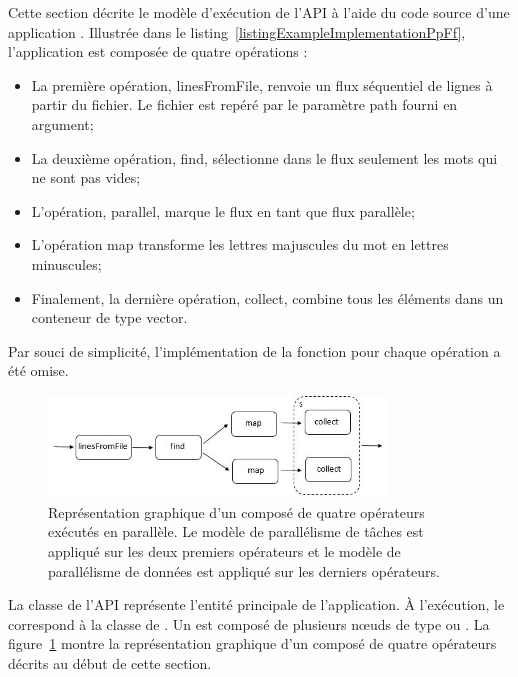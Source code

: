 Cette section d\'ecrite le mod\`ele d'ex\'ecution de l'API \`a l'aide du code source d'une application . Illustr\'ee dans le listing~\ref{listingExampleImplementationPpFf}, l'application est compos\'ee de quatre op\'erations :
\begin{itemize}
	\item La première opération, linesFromFile, renvoie un flux séquentiel de lignes à partir du fichier. Le fichier est repéré par le paramètre path fourni en argument;

	\item La deuxi\`eme op\'eration, find, s\'electionne dans le flux seulement les mots qui ne sont pas vides;

	\item L'op\'eration, parallel, marque le flux en tant que flux parall\`ele;
	
	\item L'op\'eration map transforme les lettres majuscules du mot en lettres minuscules;
	
	\item Finalement, la derni\`ere op\'eration, collect, combine tous les \'el\'ements dans un conteneur de type vector.
\end{itemize}

Par souci de simplicit\'e, l'impl\'ementation de la fonction pour chaque op\'eration a \'et\'e omise.


\begin{figure}[ht]
\centering
     \includegraphics[width=0.8\textwidth]{Figures/ExempleRuntimeExecution.jpg}
      \caption[Repr\'esentation graphique d'un  compos\'e de quatre op\'erateurs.]{Repr\'esentation graphique d'un  compos\'e de quatre op\'erateurs ex\'ecut\'es en parall\`ele. Le mod\`ele de parall\'elisme de t\^aches est appliqu\'e sur les deux premiers op\'erateurs et le mod\`ele de parall\'elisme de donn\'ees est appliqu\'e sur les derniers op\'erateurs.}
       \label{ExempleRuntimeExecution.fig}
\end{figure}


La classe  de l'API repr\'esente l'entit\'e principale de l'application. \`A l'ex\'ecution, le  correspond \`a la classe  de . Un  est compos\'e de plusieurs nœuds de type  ou . La figure~\ref{ExempleRuntimeExecution.fig} montre la repr\'esentation graphique d'un  compos\'e de quatre op\'erateurs d\'ecrits au d\'ebut de cette section.
 
